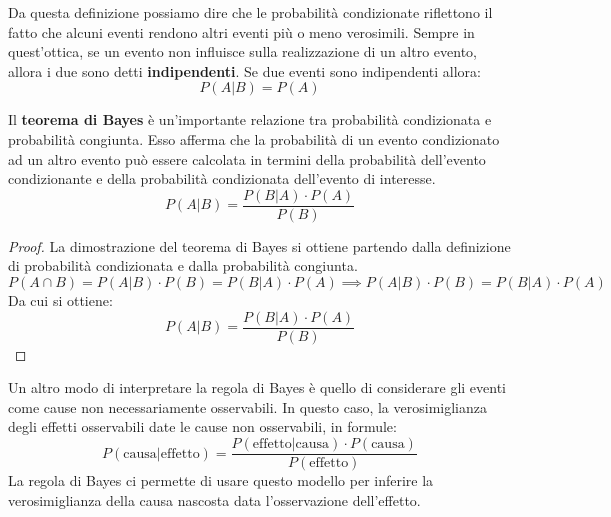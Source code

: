 Da questa definizione possiamo dire che le probabilità condizionate riflettono
il fatto che alcuni eventi rendono altri eventi più o meno verosimili. Sempre
in quest'ottica, se un evento non influisce sulla realizzazione di un altro
evento, allora i due sono detti \textbf{indipendenti}. Se due eventi sono
indipendenti allora:
\begin{equation}
    P(A | B) = P(A)
\end{equation}
\begin{definizione}
    Il \textbf{teorema di Bayes} è un'importante relazione tra probabilità
    condizionata e probabilità congiunta. Esso afferma che la probabilità di
    un evento condizionato ad un altro evento può essere calcolata in termini
    della probabilità dell'evento condizionante e della probabilità
    condizionata dell'evento di interesse.
    \begin{equation}
        P(A|B) = \frac{P(B|A) \cdot P(A)}{P(B)}
    \end{equation}
    \begin{proof}
        La dimostrazione del teorema di Bayes si ottiene partendo dalla
        definizione di probabilità condizionata e dalla probabilità congiunta.
        \begin{equation*}
            P(A \cap B) = P(A|B) \cdot P(B) = P(B|A) \cdot P(A) \implies  P(A|B)
            \cdot P(B) = P(B|A) \cdot P(A)
        \end{equation*}
        Da cui si ottiene:
        \begin{equation*}
            P(A|B) = \frac{P(B|A) \cdot P(A)}{P(B)}
        \end{equation*}
    \end{proof}
\end{definizione}
Un altro modo di interpretare la regola di Bayes è quello di considerare
gli eventi come cause non necessariamente osservabili. In questo caso, la
verosimiglianza degli effetti osservabili date le cause non osservabili, in
formule:
\begin{equation*}
    P(\text{causa}|\text{effetto}) = \frac{P(\text{effetto}|\text{causa}) \cdot
        P(\text{causa})}{P(\text{effetto})}
\end{equation*}
La regola di Bayes ci permette di usare questo modello per inferire la
verosimiglianza della causa nascosta data l'osservazione dell'effetto.

